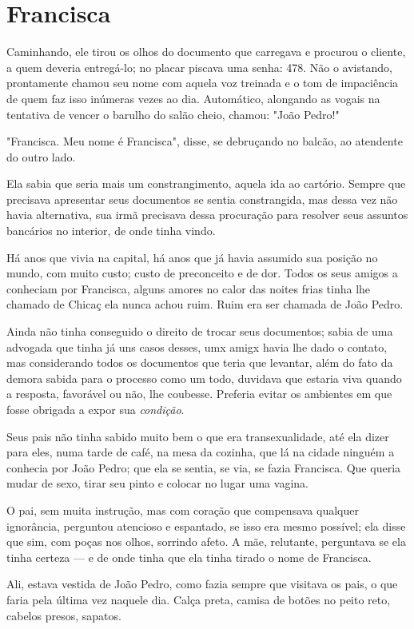 \documentclass[11pt,a4paper,twoside,openany]{book}
\begin{document}
\chapter*{Francisca}
Caminhando, ele tirou os olhos do documento que carregava e procurou o cliente, a quem deveria entregá-lo; no placar piscava uma senha: 478. Não o avistando, prontamente chamou seu nome com aquela voz treinada e o tom de impaciência de quem faz isso inúmeras vezes ao dia. Automático, alongando as vogais na tentativa de vencer o barulho do salão cheio, chamou: "João Pedro!"

"Francisca. Meu nome é Francisca", disse, se debruçando no balcão, ao atendente do outro lado.

Ela sabia que seria mais um constrangimento, aquela ida ao cartório. Sempre que precisava apresentar seus documentos se sentia constrangida, mas dessa vez não havia alternativa, sua irmã precisava dessa procuração para resolver seus assuntos bancários no interior, de onde tinha vindo.

Há anos que vivia na capital, há anos que já havia assumido sua posição no mundo, com muito custo; custo de preconceito e de dor. Todos os seus amigos a conheciam por Francisca, alguns amores no calor das noites frias tinha lhe chamado de Chicaç ela nunca achou ruim. Ruim era ser chamada de João Pedro.

Ainda não tinha conseguido o direito de trocar seus documentos; sabia de uma advogada que tinha já uns casos desses, umx amigx havia lhe dado o contato, mas considerando todos os documentos que teria que levantar, além do fato da demora sabida para o processo como um todo, duvidava que estaria viva quando a resposta, favorável ou não, lhe coubesse. Preferia evitar os ambientes em que fosse obrigada a expor sua \emph{condição}.

Seus pais não tinha  sabido muito bem o que era transexualidade, até ela dizer para eles, numa tarde de café, na mesa da cozinha, que lá na cidade ninguém a conhecia por João Pedro; que ela se sentia, se via, se fazia Francisca. Que queria mudar de sexo, tirar seu pinto e colocar no lugar uma vagina.

O pai, sem muita instrução, mas com coração que compensava qualquer ignorância, perguntou atencioso e espantado, se isso era mesmo possível; ela disse que sim, com poças nos olhos, sorrindo afeto. A mãe, relutante, perguntava se ela tinha certeza --- e de onde tinha que ela tinha tirado o nome de Francisca.

Ali, estava vestida de João Pedro, como fazia sempre que visitava os pais, o que faria pela última vez naquele dia. Calça preta, camisa de botões no peito reto, cabelos presos, sapatos.
\end{document}
